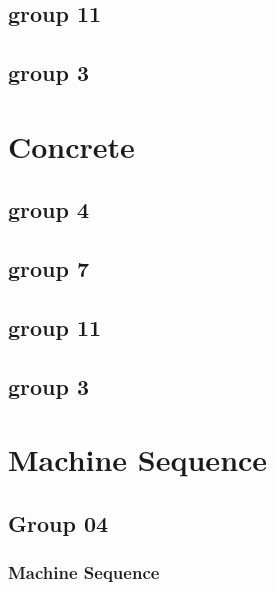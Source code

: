 \subsection{group 11}
\label{group11}

\subsection{group 3}
\label{group3}

\section{Concrete}
\label{concrete}

\subsection{group 4}
\label{group4}

\subsection{group 7}
\label{group7}

\subsection{group 11}
\label{group11}

\subsection{group 3}
\label{group3}

\section{Machine Sequence}
\label{machinesequence}

\subsection{Group 04}
\label{group04}

\subsubsection{Machine Sequence}
\label{machinesequence}

